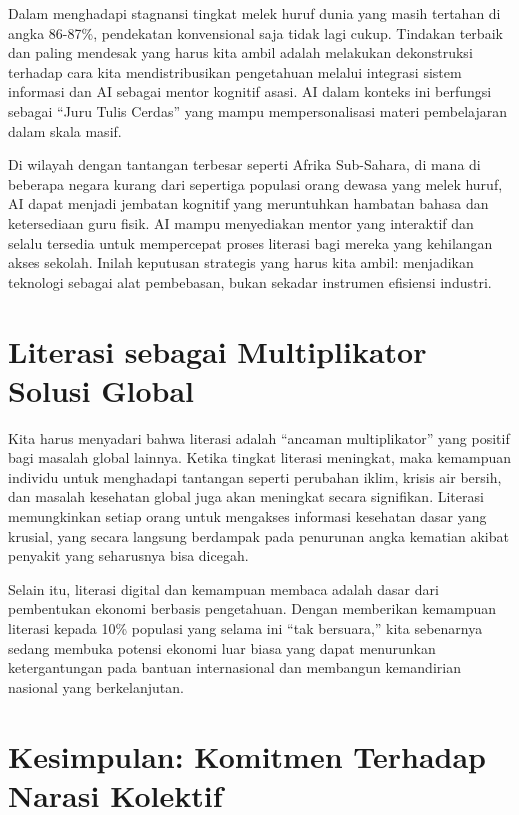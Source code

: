 \documentclass[
  letterpaper,
  DIV=11,
  numbers=noendperiod]{scrreprt}
\begin{document}
Dalam menghadapi stagnansi tingkat melek huruf dunia yang masih tertahan
di angka 86-87\%, pendekatan konvensional saja tidak lagi cukup.
Tindakan terbaik dan paling mendesak yang harus kita ambil adalah
melakukan dekonstruksi terhadap cara kita mendistribusikan pengetahuan
melalui integrasi sistem informasi dan AI sebagai mentor kognitif asasi.
AI dalam konteks ini berfungsi sebagai ``Juru Tulis Cerdas'' yang mampu
mempersonalisasi materi pembelajaran dalam skala masif.

Di wilayah dengan tantangan terbesar seperti Afrika Sub-Sahara, di mana
di beberapa negara kurang dari sepertiga populasi orang dewasa yang
melek huruf, AI dapat menjadi jembatan kognitif yang meruntuhkan
hambatan bahasa dan ketersediaan guru fisik. AI mampu menyediakan mentor
yang interaktif dan selalu tersedia untuk mempercepat proses literasi
bagi mereka yang kehilangan akses sekolah. Inilah keputusan strategis
yang harus kita ambil: menjadikan teknologi sebagai alat pembebasan,
bukan sekadar instrumen efisiensi industri.

\section{Literasi sebagai Multiplikator Solusi
Global}\label{literasi-sebagai-multiplikator-solusi-global}

Kita harus menyadari bahwa literasi adalah ``ancaman multiplikator''
yang positif bagi masalah global lainnya. Ketika tingkat literasi
meningkat, maka kemampuan individu untuk menghadapi tantangan seperti
perubahan iklim, krisis air bersih, dan masalah kesehatan global juga
akan meningkat secara signifikan. Literasi memungkinkan setiap orang
untuk mengakses informasi kesehatan dasar yang krusial, yang secara
langsung berdampak pada penurunan angka kematian akibat penyakit yang
seharusnya bisa dicegah.

Selain itu, literasi digital dan kemampuan membaca adalah dasar dari
pembentukan ekonomi berbasis pengetahuan. Dengan memberikan kemampuan
literasi kepada 10\% populasi yang selama ini ``tak bersuara,'' kita
sebenarnya sedang membuka potensi ekonomi luar biasa yang dapat
menurunkan ketergantungan pada bantuan internasional dan membangun
kemandirian nasional yang berkelanjutan.

\section{Kesimpulan: Komitmen Terhadap Narasi
Kolektif}\label{kesimpulan-komitmen-terhadap-narasi-kolektif}
\end{document}
